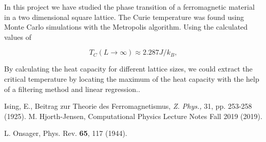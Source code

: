 \documentclass{article}
\begin{document}
In this project we have studied the phase transition of a ferromagnetic material in a  two dimensional square lattice. The Curie temperature was found using Monte Carlo simulations with the Metropolis algorithm. Using the calculated values of 




\begin{equation}
T_C(L\to\infty) \approx 2.287J/k_B,
\end{equation}

By calculating the heat capacity for different lattice sizes, we could extract the critical temperature by locating the maximum of the heat capacity with the help of a filtering method and linear regression.. 



\begin{thebibliography}{9}

 Ising, E., Beitrag zur Theorie des Ferromagnetismus,
	\emph{Z. Phys.,} 31, pp. 253-258 (1925).
 M. Hjorth-Jensen, Computational Physics Lecture Notes Fall 2019 (2019).

     L. Onsager, Phys. Rev. \textbf{65}, 117 (1944).


\end{thebibliography}
\end{document}
